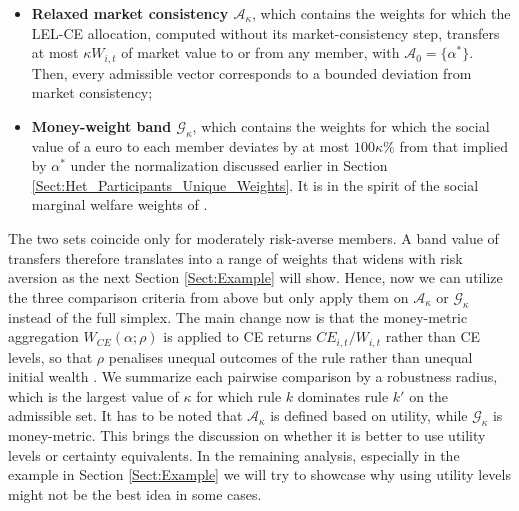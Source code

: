 \documentclass[11pt,a4paper]{article}
\theoremstyle{definition}
\theoremstyle{plain}
\theoremstyle{remark}
\newcommand{\1}{\mathbf{1}}
\begin{document}
\begin{itemize}
    \item \textbf{Relaxed market consistency $\mathcal{A}_{\kappa}$}, which contains the weights for which the LEL-CE allocation, computed without its market-consistency step, transfers at most $\kappa W_{i,t}$ of market value to or from any member, with $\mathcal{A}_0 = \{\alpha^*\}$. Then, every admissible vector corresponds to a bounded deviation from market consistency;
    \item \textbf{Money-weight band $\mathcal{G}_{\kappa}$}, which contains the weights for which the social value of a euro to each member deviates by at most $100\kappa\%$ from that implied by $\alpha^*$ under the normalization discussed earlier in Section \ref{Sect:Het_Participants_Unique_Weights}. It is in the spirit of the social marginal welfare weights of \citet{SaezStantcheva2016}.
\end{itemize}
The two sets coincide only for moderately risk-averse members. A band value of transfers therefore translates into a range of weights that widens with risk aversion as the next Section \ref{Sect:Example} will show. Hence, now we can utilize the three comparison criteria from above but only apply them on $\mathcal{A}_{\kappa}$ or $\mathcal{G}_{\kappa}$ instead of the full simplex. The main change now is that the money-metric aggregation $W_{CE}(\alpha;\rho)$ is applied to CE returns $CE_{i,t}/W_{i,t}$ rather than CE levels, so that $\rho$ penalises unequal outcomes of the rule rather than unequal initial wealth \citep{Atkinson_1970}. We summarize each pairwise comparison by a robustness radius, which is the largest value of $\kappa$ for which rule $k$ dominates rule $k'$ on the admissible set. It has to be noted that $\mathcal{A}_{\kappa}$ is defined based on utility, while $\mathcal{G}_{\kappa}$ is money-metric. This brings the discussion on whether it is better to use utility levels or certainty equivalents. In the remaining analysis, especially in the example in Section \ref{Sect:Example} we will try to showcase why using utility levels might not be the best idea in some cases.
\end{document}
